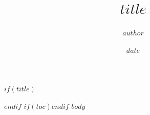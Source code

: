 \documentclass[11pt,a4paper]{report}
\title{$title$}
\author{$author$}
\date{$date$}
\begin{document}
$if(title)$\maketitle$endif$
$if(toc)$\tableofcontents\clearpage$endif$
$body$
\end{document}
